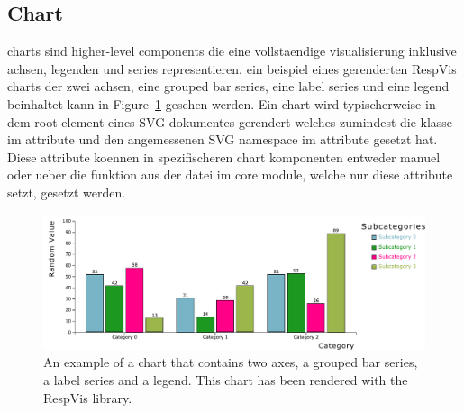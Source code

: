 \subsection{Chart}


charts sind higher-level components die eine vollstaendige visualisierung inklusive achsen, legenden und series representieren.
ein beispiel eines gerenderten RespVis charts der zwei achsen, eine grouped bar series, eine label series und eine legend beinhaltet kann in Figure~\ref{fig:Chart} gesehen werden.
Ein chart wird typischerweise in dem root  element eines SVG dokumentes gerendert welches zumindest die  klasse im  attribute und den angemessenen SVG namespace im  attribute gesetzt hat.
Diese attribute koennen in spezifischeren chart komponenten entweder manuel oder ueber die  funktion aus der  datei im core module, welche nur diese attribute setzt, gesetzt werden.

\begin{figure}[tp]
  \centering
  \includegraphics[keepaspectratio,width=\linewidth,height=\fullh]{diagrams/chart.pdf}
  \caption[Chart Example]{
    An example of a chart that contains two axes, a grouped bar series, a label series and a legend.
    This chart has been rendered with the RespVis library.
  }
  \label{fig:Chart}
\end{figure}


